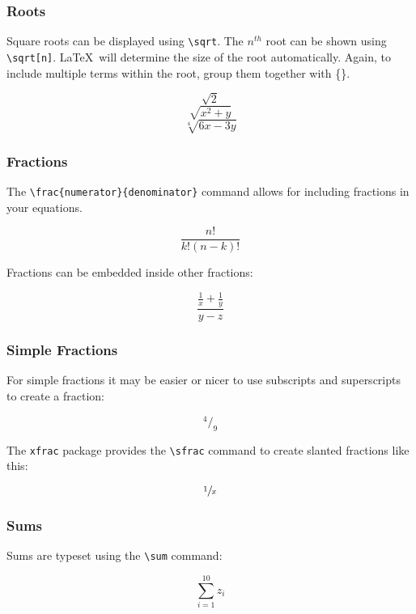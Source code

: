 \documentclass[mathserif]{beamer}
\begin{document}
\begin{frame}[fragile]
\frametitle{Roots}
\vfill
Square roots can be displayed using \texttt{{\textbackslash}sqrt}. The $n^{th}$ root can be shown using \texttt{{\textbackslash}sqrt[n]}. \LaTeX\ will determine the size of the root automatically. Again, to include multiple terms within the root, group them together with \{\}.
\vfill
	\begin{LTXexample}[style=latexsty]
		\[ \sqrt{2} \] 
		\[ \sqrt{x^2 + y} \] 
		\[ \sqrt[4]{6x - 3y} \]
	\end{LTXexample}
\vfill
\end{frame}

\begin{frame}[fragile]
\frametitle{Fractions}
\vfill
The \texttt{{\textbackslash}frac\{numerator\}\{denominator\}} command allows for including fractions in your equations. 
\vfill
	\begin{LTXexample}[style=latexsty]
		\[ \frac{n!}{k!(n-k)!} \]
	\end{LTXexample}
\vfill
Fractions can be embedded inside other fractions:
\vfill
	\begin{LTXexample}[style=latexsty]
		\[ \frac{\frac{1}{x} + \frac{1}{y}}{y-z} \]
	\end{LTXexample}
\vfill
\end{frame}

\begin{frame}[fragile]
\frametitle{Simple Fractions}
\vfill
For simple fractions it may be easier or nicer to use subscripts and superscripts to create a fraction:
\vfill
	\begin{LTXexample}[style=latexsty]
		\[ ^4/_9 \]
	\end{LTXexample}
\vfill
The \texttt{xfrac} package provides the \texttt{{\textbackslash}sfrac} command to create slanted fractions like this:
\vfill
	\begin{LTXexample}[style=latexsty]
		\[ \sfrac{1}{x} \]
	\end{LTXexample}
\vfill
\end{frame}

\begin{frame}[fragile]
\frametitle{Sums}
\vfill
Sums are typeset using the \texttt{{\textbackslash}sum} command:
\vfill
	\begin{LTXexample}[style=latexsty]
		\[ \sum_{i=1}^{10} z_i \]
	\end{LTXexample}
\vfill
\end{frame}
\end{document}
